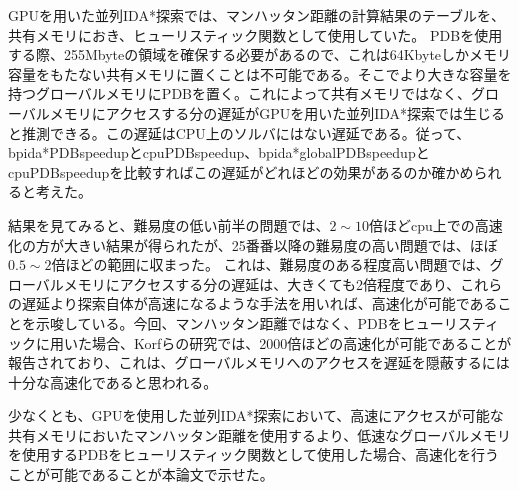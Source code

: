 \documentclass[a4paper,11pt,oneside,openany]{jsbook}
\begin{document}
GPUを用いた並列IDA*探索では、マンハッタン距離の計算結果のテーブルを、共有メモリにおき、ヒューリスティック関数として使用していた。
PDBを使用する際、255Mbyteの領域を確保する必要があるので、これは64Kbyteしかメモリ容量をもたない共有メモリに置くことは不可能である。そこでより大きな容量を持つグローバルメモリにPDBを置く。これによって共有メモリではなく、グローバルメモリにアクセスする分の遅延がGPUを用いた並列IDA*探索では生じると推測できる。この遅延はCPU上のソルバにはない遅延である。従って、bpida*PDBspeedupとcpuPDBspeedup、bpida*globalPDBspeedupとcpuPDBspeedupを比較すればこの遅延がどれほどの効果があるのか確かめられると考えた。

結果を見てみると、難易度の低い前半の問題では、$2\sim10$倍ほどcpu上での高速化の方が大きい結果が得られたが、25番番以降の難易度の高い問題では、ほぼ$0.5\sim2$倍ほどの範囲に収まった。
これは、難易度のある程度高い問題では、グローバルメモリにアクセスする分の遅延は、大きくても2倍程度であり、これらの遅延より探索自体が高速になるような手法を用いれば、高速化が可能であることを示唆している。今回、マンハッタン距離ではなく、PDBをヒューリスティックに用いた場合、Korfらの研究\cite{KF02}では、2000倍ほどの高速化が可能であることが報告されており、これは、グローバルメモリへのアクセスを遅延を隠蔽するには十分な高速化であると思われる。

少なくとも、GPUを使用した並列IDA*探索において、高速にアクセスが可能な共有メモリにおいたマンハッタン距離を使用するより、低速なグローバルメモリを使用するPDBをヒューリスティック関数として使用した場合、高速化を行うことが可能であることが本論文で示せた。



\end{document}
